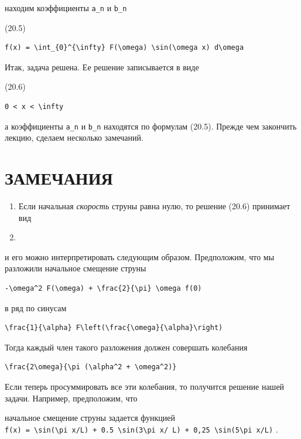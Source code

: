 \documentclass[
  ukrainian,
]{article}
\begin{document}
находим коэффициенты \texttt{a\_n} и \texttt{b\_n}

(20.5)

\begin{verbatim}
f(x) = \int_{0}^{\infty} F(\omega) \sin(\omega x) d\omega
\end{verbatim}

Итак, задача решена. Ее решение записывается в виде

(20.6)

\begin{verbatim}
0 < x < \infty
\end{verbatim}

а коэффициенты \texttt{a\_n} и \texttt{b\_n} находятся по формулам
(20.5). Прежде чем закончить лекцию, сделаем несколько замечаний.

\section{ЗАМЕЧАНИЯ}\label{ux437ux430ux43cux435ux447ux430ux43dux438ux44f}

\begin{enumerate}
\def\labelenumi{\arabic{enumi}.}
\item
  Если начальная \emph{скорость} струны равна нулю, то решение (20.6)
  принимает вид
\item
\end{enumerate}

и его можно интерпретировать следующим образом. Предположим, что мы
разложили начальное смещение струны

\begin{verbatim}
-\omega^2 F(\omega) + \frac{2}{\pi} \omega f(0)
\end{verbatim}

в ряд по синусам

\begin{verbatim}
\frac{1}{\alpha} F\left(\frac{\omega}{\alpha}\right)
\end{verbatim}

Тогда каждый член такого разложения должен совершать колебания

\begin{verbatim}
\frac{2\omega}{\pi (\alpha^2 + \omega^2)}
\end{verbatim}

Если теперь просуммировать все эти колебания, то получится решение нашей
задачи. Например, предположим, что

начальное смещение струны задается функцией
\texttt{f(x)\ =\ \textbackslash{}sin(\textbackslash{}pi\ x/L)\ +\ 0.5\ \textbackslash{}sin(3\textbackslash{}pi\ x/\ L)\ +\ 0,25\ \textbackslash{}sin(5\textbackslash{}pi\ x/L)}
.
\end{document}
